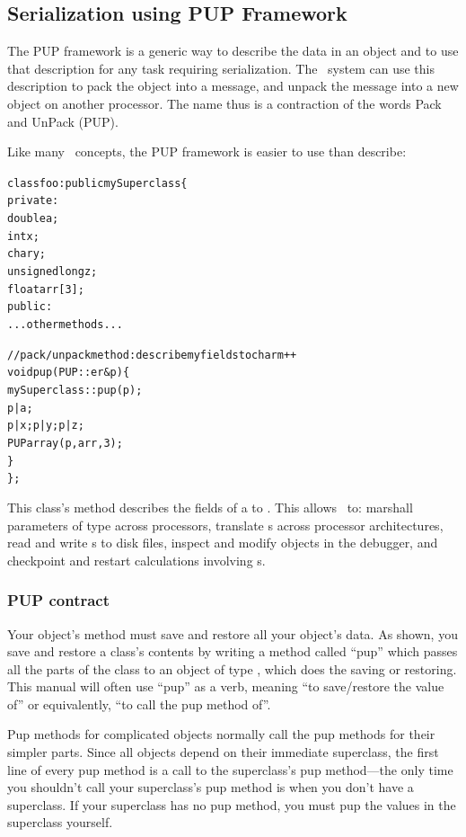 \subsection{Serialization using PUP Framework}

\label{sec:pup}

The  PUP framework is a generic way to describe the data in an object and to use that description for any task requiring serialization.
The \charmpp\ system can use this description to pack the object 
into a message, and unpack the message into a new object on another 
processor. 
The name thus is a contraction of the words Pack and UnPack (PUP). 

Like many \CC\ concepts, the PUP framework is easier to use than 
describe: 

\begin{alltt}
class foo : public mySuperclass \{
 private:
    double a;
    int x;
    char y;
    unsigned long z;
    float arr[3];
 public:
    ...other methods...

    //pack/unpack method: describe my fields to charm++
    void pup(PUP::er &p) \{
      mySuperclass::pup(p);
      p|a;
      p|x; p|y; p|z;
      PUParray(p,arr,3);
    \}
\};
\end{alltt}

This class's  method describes the fields of a  to \charmpp{}.
This allows \charmpp\ to: marshall parameters of type  across processors,
translate s across processor architectures, read and write s
to disk files, inspect and modify  objects in the debugger, and 
checkpoint and restart calculations involving s.



\subsubsection{PUP contract}

\label{sec:pupcontract}
Your object's  method must save and restore all your object's
data.  As shown, you save and restore a class's contents by writing a
method called ``pup'' which passes all the parts of the class to an
object of type  , which does the saving or
restoring.  This manual will often use ``pup'' as a verb, meaning ``to
save/restore the value of'' or equivalently, ``to call the pup method
of''.

Pup methods for complicated objects normally call the pup methods
for their simpler parts.  Since all objects depend on their immediate
superclass, the first line of every pup method is a call to the 
superclass's pup method---the only time you shouldn't call your superclass's
pup method is when you don't have a superclass.  If your superclass has
no pup method, you must pup the values in the superclass yourself.


